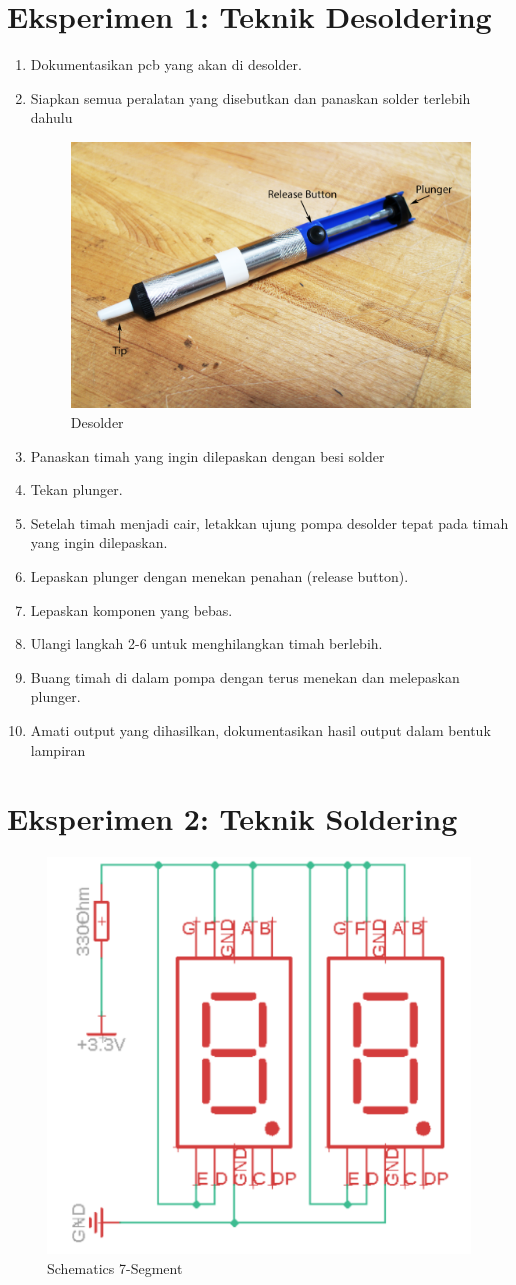 \section{Eksperimen 1: Teknik Desoldering}
\begin{enumerate}
    \item Dokumentasikan pcb yang akan di desolder.
    \item Siapkan semua peralatan yang disebutkan dan panaskan solder terlebih dahulu
        \begin{figure}[H]
            \centering
            \includegraphics[width=0.6\linewidth]{P2/img/desolder.png}
            \caption{Desolder}
            \label{fig:desolder}
        \end{figure}
    \item Panaskan timah yang ingin  dilepaskan dengan besi solder
    \item Tekan plunger.
    \item Setelah timah menjadi cair, letakkan ujung pompa desolder tepat pada timah yang ingin dilepaskan.
    \item Lepaskan plunger dengan menekan penahan (release button).
    \item Lepaskan komponen yang bebas.
    \item Ulangi langkah 2-6 untuk menghilangkan timah berlebih.
    \item Buang timah di dalam pompa dengan terus menekan dan melepaskan plunger.
    \item Amati output yang dihasilkan, dokumentasikan hasil output dalam bentuk lampiran
\end{enumerate}
\section{Eksperimen 2: Teknik Soldering}
\begin{figure}[H]
    \centering
    \includegraphics[width=0.4\linewidth]{P2/img/schematics.png}
    \caption{Schematics 7-Segment}
    \label{fig:schematics7Segment}
\end{figure}

